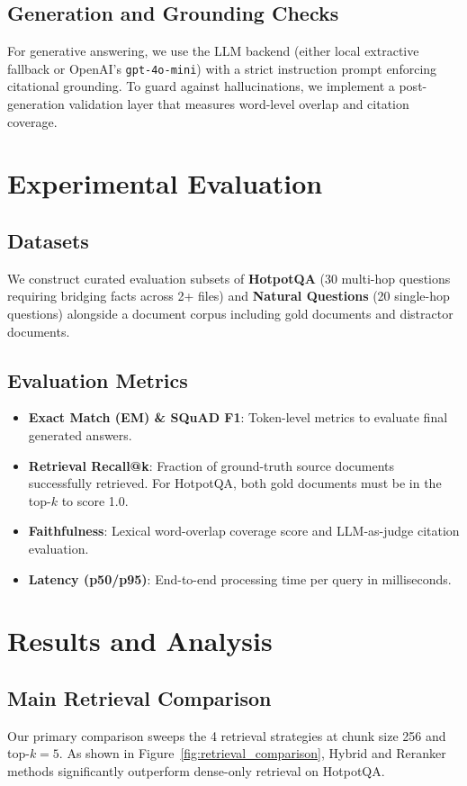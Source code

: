 \documentclass{article}
\begin{document}
\subsection{Generation and Grounding Checks}
For generative answering, we use the LLM backend (either local extractive fallback or OpenAI's \texttt{gpt-4o-mini}) with a strict instruction prompt enforcing citational grounding. To guard against hallucinations, we implement a post-generation validation layer that measures word-level overlap and citation coverage.

\section{Experimental Evaluation}

\subsection{Datasets}
We construct curated evaluation subsets of \textbf{HotpotQA} (30 multi-hop questions requiring bridging facts across 2+ files) and \textbf{Natural Questions} (20 single-hop questions) alongside a document corpus including gold documents and distractor documents.

\subsection{Evaluation Metrics}
\begin{itemize}
    \item \textbf{Exact Match (EM) \& SQuAD F1}: Token-level metrics to evaluate final generated answers.
    \item \textbf{Retrieval Recall@k}: Fraction of ground-truth source documents successfully retrieved. For HotpotQA, both gold documents must be in the top-$k$ to score 1.0.
    \item \textbf{Faithfulness}: Lexical word-overlap coverage score and LLM-as-judge citation evaluation.
    \item \textbf{Latency (p50/p95)}: End-to-end processing time per query in milliseconds.
\end{itemize}

\section{Results and Analysis}

\subsection{Main Retrieval Comparison}
Our primary comparison sweeps the 4 retrieval strategies at chunk size 256 and top-$k=5$.
As shown in Figure~\ref{fig:retrieval_comparison}, Hybrid and Reranker methods significantly outperform dense-only retrieval on HotpotQA. 
\end{document}
